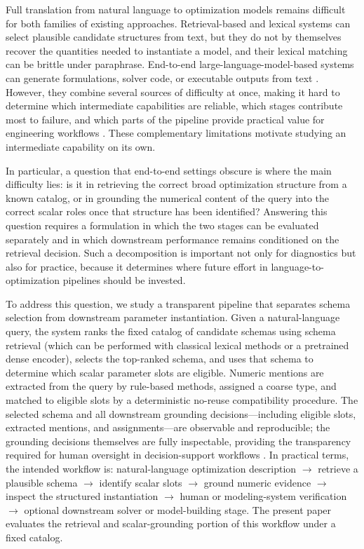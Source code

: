 \documentclass[pdflatex,sn-basic,Numbered]{sn-jnl}
\begin{document}
Full translation from natural language to optimization models remains difficult for both families of existing approaches. Retrieval-based and lexical systems can select plausible candidate structures from text, but they do not by themselves recover the quantities needed to instantiate a model, and their lexical matching can be brittle under paraphrase. End-to-end large-language-model-based systems can generate formulations, solver code, or executable outputs from text \cite{ahmaditeshnizi2024optimus_icml,zhang2024optllm,ahmed2025opt2code}. However, they combine several sources of difficulty at once, making it hard to determine which intermediate capabilities are reliable, which stages contribute most to failure, and which parts of the pipeline provide practical value for engineering workflows \cite{astorga2025autoformulation,huang2025orlm,lu2025optmath}. These complementary limitations motivate studying an intermediate capability on its own.

In particular, a question that end-to-end settings obscure is where the main difficulty lies: is it in retrieving the correct broad optimization structure from a known catalog, or in grounding the numerical content of the query into the correct scalar roles once that structure has been identified? Answering this question requires a formulation in which the two stages can be evaluated separately and in which downstream performance remains conditioned on the retrieval decision. Such a decomposition is important not only for diagnostics but also for practice, because it determines where future effort in language-to-optimization pipelines should be invested.

To address this question, we study a transparent pipeline that separates schema selection from downstream parameter instantiation. Given a natural-language query, the system ranks the fixed catalog of candidate schemas using schema retrieval (which can be performed with classical lexical methods or a pretrained dense encoder), selects the top-ranked schema, and uses that schema to determine which scalar parameter slots are eligible. Numeric mentions are extracted from the query by rule-based methods, assigned a coarse type, and matched to eligible slots by a deterministic no-reuse compatibility procedure. The selected schema and all downstream grounding decisions---including eligible slots, extracted mentions, and assignments---are observable and reproducible; the grounding decisions themselves are fully inspectable, providing the transparency required for human oversight in decision-support workflows \cite{biemans2025explainableoptimization,powell2025scheduling_explanations}. In practical terms, the intended workflow is: natural-language optimization description $\rightarrow$ retrieve a plausible schema $\rightarrow$ identify scalar slots $\rightarrow$ ground numeric evidence $\rightarrow$ inspect the structured instantiation $\rightarrow$ human or modeling-system verification $\rightarrow$ optional downstream solver or model-building stage. The present paper evaluates the retrieval and scalar-grounding portion of this workflow under a fixed catalog.
\end{document}
